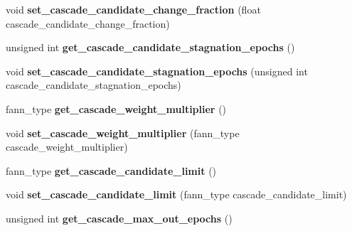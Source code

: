 \begin{DoxyCompactItemize}
\item 
\hypertarget{class_f_a_n_n_1_1neural__net_a5eaeb5bc6b2f9d13e21773d0e61c8693}{void {\bfseries set\-\_\-cascade\-\_\-candidate\-\_\-change\-\_\-fraction} (float cascade\-\_\-candidate\-\_\-change\-\_\-fraction)}\label{class_f_a_n_n_1_1neural__net_a5eaeb5bc6b2f9d13e21773d0e61c8693}

\item 
\hypertarget{class_f_a_n_n_1_1neural__net_a457c2b62099b52a5fcb7c389be9b7f26}{unsigned int {\bfseries get\-\_\-cascade\-\_\-candidate\-\_\-stagnation\-\_\-epochs} ()}\label{class_f_a_n_n_1_1neural__net_a457c2b62099b52a5fcb7c389be9b7f26}

\item 
\hypertarget{class_f_a_n_n_1_1neural__net_a216a7b63c5d536d90f0e6c38632025e4}{void {\bfseries set\-\_\-cascade\-\_\-candidate\-\_\-stagnation\-\_\-epochs} (unsigned int cascade\-\_\-candidate\-\_\-stagnation\-\_\-epochs)}\label{class_f_a_n_n_1_1neural__net_a216a7b63c5d536d90f0e6c38632025e4}

\item 
\hypertarget{class_f_a_n_n_1_1neural__net_af1e74938f04176668d78d65b6214d9bb}{fann\-\_\-type {\bfseries get\-\_\-cascade\-\_\-weight\-\_\-multiplier} ()}\label{class_f_a_n_n_1_1neural__net_af1e74938f04176668d78d65b6214d9bb}

\item 
\hypertarget{class_f_a_n_n_1_1neural__net_af99a0bf4dcdb1095af7230c424028132}{void {\bfseries set\-\_\-cascade\-\_\-weight\-\_\-multiplier} (fann\-\_\-type cascade\-\_\-weight\-\_\-multiplier)}\label{class_f_a_n_n_1_1neural__net_af99a0bf4dcdb1095af7230c424028132}

\item 
\hypertarget{class_f_a_n_n_1_1neural__net_afe52986e8cb4459a61a8e1700789ea83}{fann\-\_\-type {\bfseries get\-\_\-cascade\-\_\-candidate\-\_\-limit} ()}\label{class_f_a_n_n_1_1neural__net_afe52986e8cb4459a61a8e1700789ea83}

\item 
\hypertarget{class_f_a_n_n_1_1neural__net_a3af48b722d197dc029ad3244bf0e114a}{void {\bfseries set\-\_\-cascade\-\_\-candidate\-\_\-limit} (fann\-\_\-type cascade\-\_\-candidate\-\_\-limit)}\label{class_f_a_n_n_1_1neural__net_a3af48b722d197dc029ad3244bf0e114a}

\item 
\hypertarget{class_f_a_n_n_1_1neural__net_a68668ab39dfb5f2b10c6199adce33e83}{unsigned int {\bfseries get\-\_\-cascade\-\_\-max\-\_\-out\-\_\-epochs} ()}\label{class_f_a_n_n_1_1neural__net_a68668ab39dfb5f2b10c6199adce33e83}


\end{DoxyCompactItemize}
